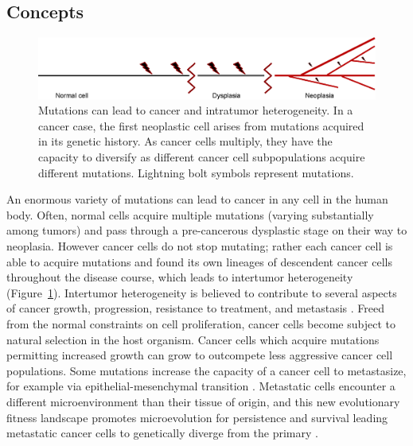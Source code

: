 \subsection{Concepts}
\begin{figure}[htb]
    \centering
    \includegraphics[width=0.95\linewidth,keepaspectratio]{images/intro/heterogeneity_diagram}
    \caption[Tumor heterogeneity arises from cancer mutation.]{Mutations can lead to cancer and intratumor heterogeneity. In a cancer case, the first neoplastic cell arises from mutations acquired in its genetic history. As cancer cells multiply, they have the capacity to diversify as different cancer cell subpopulations acquire different mutations. Lightning bolt symbols represent mutations.}
    \label{fig:intro:heterogeneity_diagram}
\end{figure}
An enormous variety of mutations can lead to cancer in any cell in the human body. Often, normal cells acquire multiple mutations (varying substantially among tumors) and pass through a pre-cancerous dysplastic stage on their way to neoplasia. However cancer cells do not stop mutating; rather each cancer cell is able to acquire mutations and found its own lineages of descendent cancer cells throughout the disease course, which leads to intertumor heterogeneity (Figure~\ref{fig:intro:heterogeneity_diagram}). Intertumor heterogeneity is believed to contribute to several aspects of cancer growth, progression, resistance to treatment, and metastasis \cite{mcgranahan2017}. Freed from the normal constraints on cell proliferation, cancer cells become subject to natural selection in the host organism. Cancer cells which acquire mutations permitting increased growth can grow to outcompete less aggressive cancer cell populations. Some mutations increase the capacity of a cancer cell to metastasize, for example via epithelial-mesenchymal transition \cite{zhang2018}. Metastatic cells encounter a different microenvironment than their tissue of origin, and this new evolutionary fitness landscape promotes microevolution for persistence and survival leading metastatic cancer cells to genetically diverge from the primary \cite{zeeshan2017}.


